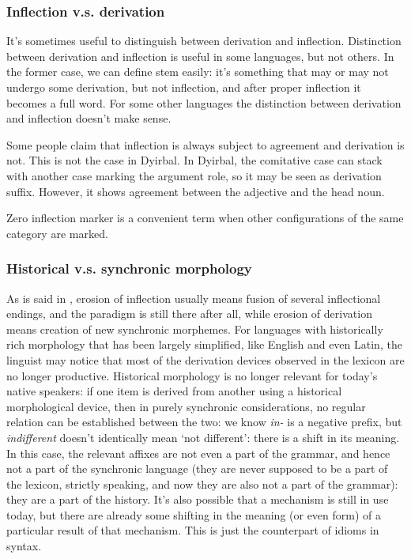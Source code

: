 \documentclass[UTF8, a4paper, oneside, scheme=plain]{ctexart}
\newcommand*{\corpus}[1]{\emph{#1}}
\newcommand*{\translate}[1]{`#1'}
\begin{document}
\subsubsection{Inflection v.s. derivation}\label{sec:inflection-derivation}

It's sometimes useful to distinguish between derivation and inflection. 
Distinction between derivation and inflection is useful in some languages, but not others. 
In the former case, we can define stem easily: it's something that may or may not undergo some derivation, 
but not inflection, and after proper inflection it becomes a full word. 
For some other languages the distinction between derivation and inflection doesn't make sense. 

Some people claim that inflection is always subject to agreement and derivation is not. 
This is not the case in Dyirbal. 
In Dyirbal, the comitative case can stack with another case marking the argument role, 
so it may be seen as derivation suffix. 
However, it shows agreement between the adjective and the head noun.

Zero inflection marker is a convenient term when other configurations of the same category are marked.

\subsubsection{Historical v.s. synchronic morphology}\label{sec:history-or-current-morphology}

As is said in ,
erosion of inflection usually means fusion of several inflectional endings,
and the paradigm is still there after all,
while erosion of derivation means creation of new synchronic morphemes.
For languages with historically rich morphology
that has been largely simplified, 
like English and even Latin, 
the linguist may notice that most of the derivation devices observed in the lexicon 
are no longer productive.
Historical morphology is no longer relevant for today's native speakers:
if one item is derived from another using a historical morphological device,
then in purely synchronic considerations,
no regular relation can be established between the two:
we know \corpus{in-} is a negative prefix, 
but \corpus{indifferent} doesn't identically mean \translate{not different}:
there is a shift in its meaning.
In this case, the relevant affixes are not even a part of the grammar,
and hence not a part of the synchronic language
(they are never supposed to be a part of the lexicon, strictly speaking,
and now they are also not a part of the grammar):
they are a part of the history.
It's also possible that a mechanism is still in use today,
but there are already some shifting in the meaning (or even form) 
of a particular result of that mechanism.
This is just the counterpart of idioms in syntax.
\end{document}
